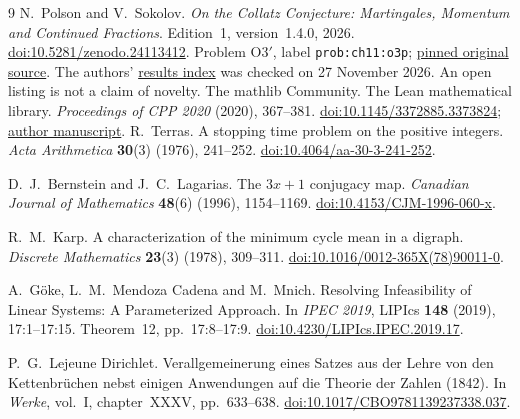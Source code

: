 \documentclass[11pt,letterpaper]{article}
\begin{document}
\clearpage
\begin{thebibliography}{9}
N.~Polson and V.~Sokolov.
\emph{On the Collatz Conjecture: Martingales, Momentum and Continued Fractions}.
Edition~1, version~1.4.0, 2026.
\href{https://doi.org/10.5281/zenodo.24113412}{doi:10.5281/zenodo.24113412}.
Problem O3$'$, label \texttt{prob:ch11:o3p};
\href{https://github.com/VadimSokolov/collatz/blob/5840497a23fc0d64127b850aea68862d7c93f2b7/book/chapters/ch11_open.tex}{pinned original source}.
The authors' \href{https://vsokolov.org/books/collatz/results.html}{results index}
was checked on 27 November 2026. An open listing is not a claim of novelty.
The mathlib Community. The Lean mathematical library.
\emph{Proceedings of CPP 2020} (2020), 367--381.
\href{https://doi.org/10.1145/3372885.3373824}{doi:10.1145/3372885.3373824};
\href{https://arxiv.org/abs/1910.09336}{author manuscript}.
R.~Terras. A stopping time problem on the positive integers.
\emph{Acta Arithmetica} \textbf{30}(3) (1976), 241--252.
\href{https://doi.org/10.4064/aa-30-3-241-252}{doi:10.4064/aa-30-3-241-252}.

D.~J.~Bernstein and J.~C.~Lagarias. The $3x+1$ conjugacy map.
\emph{Canadian Journal of Mathematics} \textbf{48}(6) (1996), 1154--1169.
\href{https://doi.org/10.4153/CJM-1996-060-x}{doi:10.4153/CJM-1996-060-x}.

R.~M.~Karp. A characterization of the minimum cycle mean in a digraph.
\emph{Discrete Mathematics} \textbf{23}(3) (1978), 309--311.
\href{https://doi.org/10.1016/0012-365X(78)90011-0}{doi:10.1016/0012-365X(78)90011-0}.

A.~G\"oke, L.~M.~Mendoza Cadena and M.~Mnich.
Resolving Infeasibility of Linear Systems: A Parameterized Approach.
In \emph{IPEC 2019}, LIPIcs \textbf{148} (2019), 17:1--17:15.
Theorem~12, pp.~17:8--17:9.
\href{https://doi.org/10.4230/LIPIcs.IPEC.2019.17}{doi:10.4230/LIPIcs.IPEC.2019.17}.

P.~G.~Lejeune Dirichlet.
Verallgemeinerung eines Satzes aus der Lehre von den Kettenbr\"uchen
nebst einigen Anwendungen auf die Theorie der Zahlen (1842).
In \emph{Werke}, vol.~I, chapter~XXXV, pp.~633--638.
\href{https://doi.org/10.1017/CBO9781139237338.037}{doi:10.1017/CBO9781139237338.037}.

\end{thebibliography}
\end{document}
